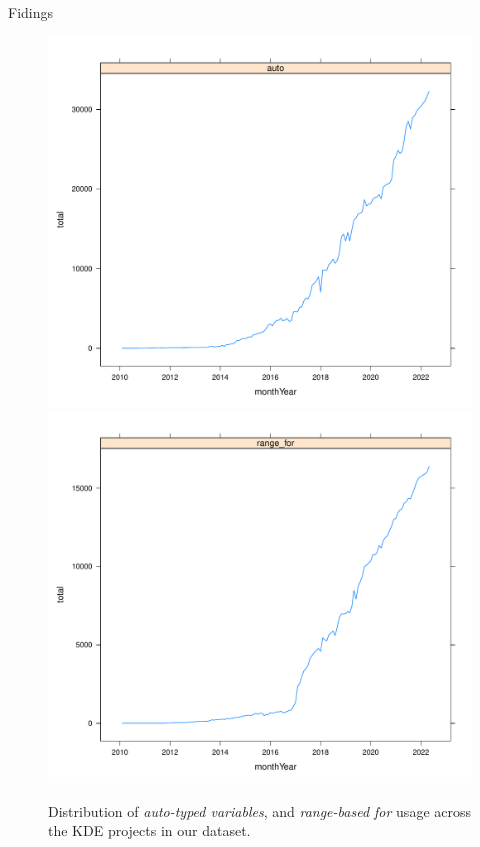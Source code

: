 \documentclass[newPxFont,numfooter,sectionpages]{beamer}
\newcommand{\autoDecl}{\emph{auto-typed variables}\xspace}
\newcommand{\rangeFor}{\emph{range-based for}\xspace}
\begin{document}

\begin{frame}{Fidings}

\begin{figure}[ht]
  \centering
  \caption{\footnotesize Distribution of \autoDecl, and \rangeFor usage across the KDE projects in our dataset.}
  \includegraphics[width=.49\textwidth]{images/auto.pdf}\hfill
  \includegraphics[width=.49\textwidth]{images/range_for.pdf}\hfill
  \label{fig:features}
\end{figure}

\end{frame}

\end{document}
